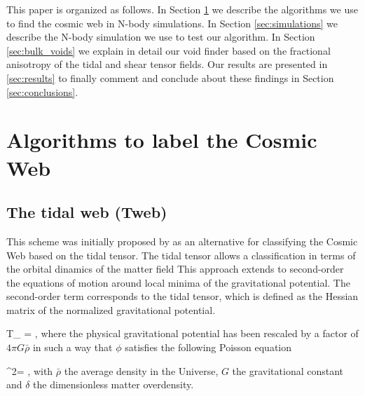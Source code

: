 \documentclass[a4,useAMS,usenatbib,usegraphicx]{latex/mn2e}
\begin{document}
This paper is organized as follows. 
In Section \ref{sec:algorithms_cosmic_web} we describe the algorithms
we use to find the cosmic web in N-body simulations. 
In Section  \ref{sec:simulations} we describe the N-body simulation we
use to test our algorithm. 
In Section \ref{sec:bulk_voids} we explain in detail our void finder
based on the fractional anisotropy of the tidal and shear tensor
fields. 
Our results are presented in \ref{sec:results} to finally comment and
conclude about these findings in Section \ref{sec:conclusions}. 


\section{Algorithms to label the Cosmic Web}
\label{sec:algorithms_cosmic_web}


\subsection{The tidal web (Tweb)}
\label{subsec:Tweb}


This scheme was initially proposed by \citet{Hahn07} as an
alternative for classifying the Cosmic Web based on the tidal tensor.
The tidal tensor allows a classification in terms of the orbital
dinamics of the matter field
This approach extends to second-order the equations of motion around 
local minima of the gravitational potential. 
The second-order term corresponds to the tidal tensor, which is
defined as the Hessian matrix of the normalized gravitational
potential.


{	T_{\alpha\beta} = ,	}
where the physical gravitational potential has been rescaled by a
factor of   $4\pi G\bar{\rho}$ in such a way that $\phi$ satisfies the following 
Poisson equation

{	\nabla^2\phi = \delta,	}
with $\bar{\rho}$ the average density in the Universe, $G$ the 
gravitational constant and $\delta$ the dimensionless matter
overdensity. 
\end{document}
